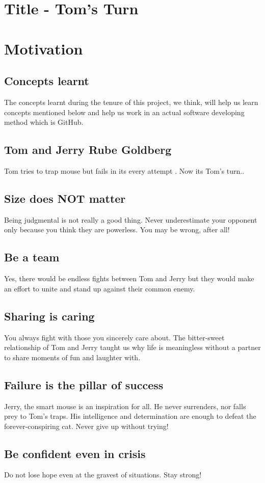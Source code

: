 \documentclass{article}
\begin{document}
\newpage
\section{Title - Tom's Turn} \label{Title}
\section{Motivation} \label{Motivation} 
\subsection{Concepts learnt}
 The concepts learnt during the tenure of this project, we think, will help us learn concepts mentioned below and help us work in an actual software developing method which is GitHub.
\subsection{Tom and Jerry Rube Goldberg}
Tom tries to trap mouse but fails in its every attempt \cite{TomandJerry} . 
Now its Tom's turn..
\subsection{Size does NOT matter}
Being judgmental is not really a good thing. Never underestimate your opponent only because you think they are powerless. You may be wrong, after all!
\subsection{Be a team}
Yes, there would be endless fights between Tom and Jerry but they would make an effort to unite and stand up against their common enemy.
\subsection{Sharing is caring}
You always fight with those you sincerely care about. The bitter-sweet relationship of Tom and Jerry taught us why life is meaningless without a partner to share moments of fun and laughter with.
\subsection{Failure is the pillar of success}
Jerry, the smart mouse is an inspiration for all. He never surrenders, nor falls prey to Tom's traps. His intelligence and determination are enough to defeat the forever-conspiring cat. Never give up without trying!
\subsection{Be confident even in crisis}
Do not lose hope even at the gravest of situations. Stay strong!
\end{document}
